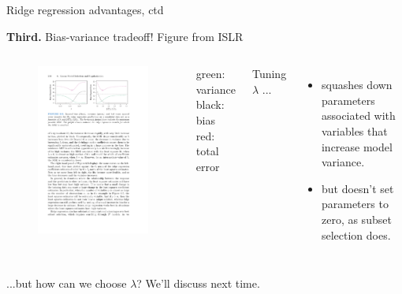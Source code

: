 \documentclass[mathserif, aspectratio=169]{beamer}
\begin{document}
\begin{frame}{Ridge regression advantages, ctd}

\textbf{Third.}  Bias-variance tradeoff! {\tiny Figure from ISLR}

\begin{columns}
\begin{figure}
\includegraphics[scale=1.1]{bias-variance-ridge}
\end{figure}


green: variance\\
black: bias\\
red: total error

\vspace{5mm}

Tuning $\lambda$ ...
\begin{itemize}
	\item squashes down parameters associated with variables that increase model variance. 
	\item but doesn't set parameters to zero, as subset selection does.
\end{itemize}

\end{columns}
 

\pause 
...but how can we choose $\lambda$?  We'll discuss next time.
\end{frame}
\end{document}
